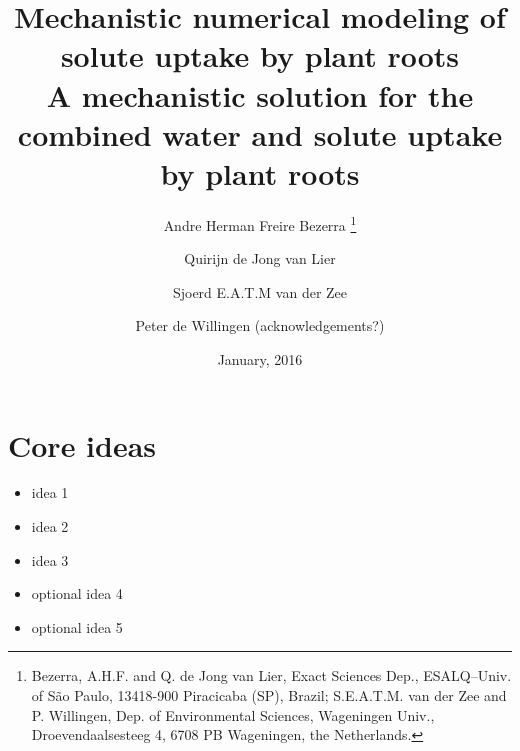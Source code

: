 \documentclass[10pt,a4paper,titlepage]{article}
\title{Mechanistic numerical modeling of solute uptake by plant roots \\ A mechanistic solution for the combined water and solute uptake by plant roots}
\date{January, 2016}
\author{Andre Herman Freire Bezerra
  \thanks{
  Bezerra, A.H.F. and Q. de Jong van Lier, Exact Sciences Dep., ESALQ--Univ. of S\~ao Paulo, 13418-900 Piracicaba (SP), Brazil;
  S.E.A.T.M. van der Zee and P. Willingen, Dep. of Environmental Sciences, Wageningen Univ., Droevendaalsesteeg 4, 6708 PB Wageningen, the Netherlands.
  }
\and Quirijn de Jong van Lier \and Sjoerd E.A.T.M van der Zee \and Peter de Willingen (acknowledgements?)}
\begin{document}
\linenumbers
\maketitle

\section*{Core ideas}
\begin{itemize}
  \item idea 1
  \item idea 2
  \item idea 3
  \item optional idea 4
  \item optional idea 5
\end{itemize}










 
\pagebreak

\end{document}
